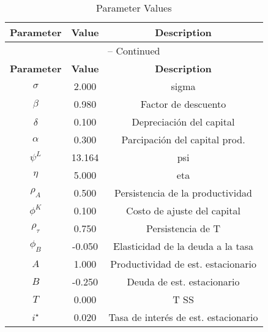 \begin{center}
\begin{longtable}{ccc}
\caption{Parameter Values}\\%
\toprule%
\multicolumn{1}{c}{\textbf{Parameter}} &
\multicolumn{1}{c}{\textbf{Value}} &
 \multicolumn{1}{c}{\textbf{Description}}\\%
\midrule%
\endfirsthead
\multicolumn{3}{c}{{\tablename} \thetable{} -- Continued}\\%
\midrule%
\multicolumn{1}{c}{\textbf{Parameter}} &
\multicolumn{1}{c}{\textbf{Value}} &
  \multicolumn{1}{c}{\textbf{Description}}\\%
\midrule%
\endhead
$\sigma$ 	 & 	 2.000 	 & 	 sigma\\
$\beta$ 	 & 	 0.980 	 & 	 Factor de descuento\\
$\delta$ 	 & 	 0.100 	 & 	 Depreciación del capital\\
$\alpha$ 	 & 	 0.300 	 & 	 Parcipación del capital prod.\\
$\psi^L$ 	 & 	 13.164 	 & 	 psi\\
$\eta$ 	 & 	 5.000 	 & 	 eta\\
$\rho_{A}$ 	 & 	 0.500 	 & 	 Persistencia de la productividad\\
$\phi^{K}$ 	 & 	 0.100 	 & 	 Costo de ajuste del capital\\
$\rho_{\tau}$ 	 & 	 0.750 	 & 	 Persistencia de T\\
$\phi_{B}$ 	 & 	 -0.050 	 & 	 Elasticidad de la deuda a la tasa\\
$A$ 	 & 	 1.000 	 & 	 Productividad de est. estacionario\\
$B$ 	 & 	 -0.250 	 & 	 Deuda de est. estacionario\\
$T$ 	 & 	 0.000 	 & 	 T SS\\
$i^{\star}$ 	 & 	 0.020 	 & 	 Tasa de interés de est. estacionario\\
\bottomrule%
\end{longtable}
\end{center}

